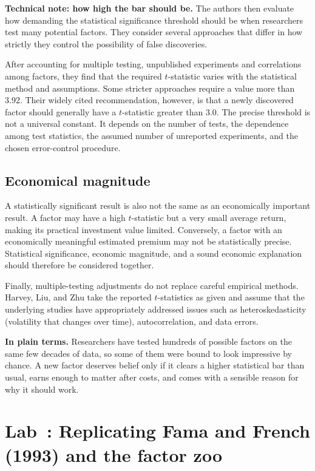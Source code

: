 \begin{technote}
\textbf{Technical note: how high the bar should be.} The authors then evaluate how demanding the statistical
significance threshold should be when researchers test many
potential factors. They consider several approaches that
differ in how strictly they control the possibility of false
discoveries. 


After accounting for multiple testing, unpublished
experiments and correlations among factors, they find
that the required $t$-statistic varies with the statistical
method and assumptions. Some stricter approaches require
a value more than 3.92. Their widely cited recommendation,
however, is that a newly discovered factor should generally
have a $t$-statistic greater than 3.0.
The precise threshold is not a universal constant. It depends
on the number of tests, the dependence among test statistics,
the assumed number of unreported experiments, and the chosen
error-control procedure.
\end{technote}

\subsection{Economical magnitude}
A statistically significant result is also not the same
as an economically important result. A factor may have a
high $t$-statistic but a very small average return, making
its practical investment value limited. Conversely, a
factor with an economically meaningful estimated premium
may not be statistically precise. Statistical significance,
economic magnitude, and a sound economic explanation
should therefore be considered together.

Finally, multiple-testing adjustments do not replace
careful empirical methods. Harvey, Liu, and Zhu take the
reported $t$-statistics as given and assume that the
underlying studies have appropriately addressed issues
such as heteroskedasticity (volatility that changes over time), autocorrelation, and data
errors.

\noindent\textbf{In plain terms.} Researchers have tested hundreds of possible factors on the same few decades of data, so some of them were bound to look impressive by chance. A new factor deserves belief only if it clears a higher statistical bar than usual, earns enough to matter after costs, and comes with a sensible reason for why it should work.

\section{Lab~\thechapter: Replicating Fama and French (1993) and the factor zoo}
\label{sec:04-lab}

